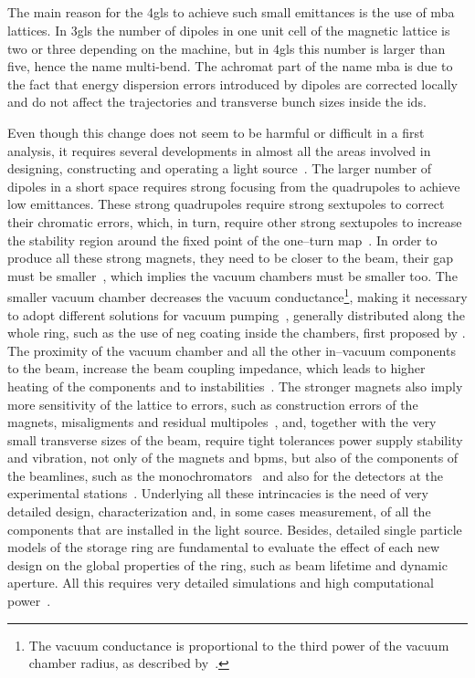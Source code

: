 \subsection{}

    The main reason for the \gls{4gls} to achieve such small emittances is the use of \gls{mba} lattices. In \gls{3gls} the number of dipoles in one unit cell of the magnetic lattice is two or three depending on the machine, but in \gls{4gls} this number is larger than five, hence the name multi-bend. The achromat part of the name \gls{mba} is due to the fact that energy dispersion errors introduced by dipoles are corrected locally and do not affect the trajectories and transverse bunch sizes inside the \glspl{id}.

    Even though this change does not seem to be harmful or difficult in a first analysis, it requires several developments in almost all the areas involved in designing, constructing and operating a light source~\cite{Eriksson2014,Liu2017}. The larger number of dipoles in a short space requires strong focusing from the quadrupoles to achieve low emittances. These strong quadrupoles require strong sextupoles to correct their chromatic errors, which, in turn, require other strong sextupoles to increase the stability region around the fixed point of the one--turn map~\cite{Borland2014}. In order to produce all these strong magnets, they need to be closer to the beam, their gap must be smaller~\cite{Johansson2014}, which implies the vacuum chambers must be smaller too. The smaller vacuum chamber decreases the vacuum conductance\footnote{The vacuum conductance is proportional to the third power of the vacuum chamber radius, as described by~.}, making it necessary to adopt different solutions for vacuum pumping~\cite{Al-Dmour2014}, generally distributed along the whole ring, such as the use of \gls{neg} coating inside the chambers, first proposed by .
    The proximity of the vacuum chamber and all the other in--vacuum components to the beam, increase the beam coupling impedance, which leads to higher heating of the components and to instabilities~\cite{Nagaoka2014}. The stronger magnets also imply more sensitivity of the lattice to errors, such as construction errors of the magnets, misaligments and residual multipoles~\cite{Neuenschwander2015,Hettel2014}, and, together with the very small transverse sizes of the beam, require tight tolerances power supply stability and vibration, not only of the magnets and \glspl{bpm}, but also of the components of the beamlines, such as the monochromators~\cite{Susini2014,Siewert2014} and also for the detectors at the experimental stations~\cite{Denes2014}. Underlying all these intrincacies is the need of very detailed design, characterization and, in some cases measurement, of all the components that are installed in the light source. Besides, detailed single particle models of the storage ring are fundamental to evaluate the effect of each new design on the global properties of the ring, such as beam lifetime and dynamic aperture. All this requires very detailed simulations and high computational power~\cite{Borland2014}.

